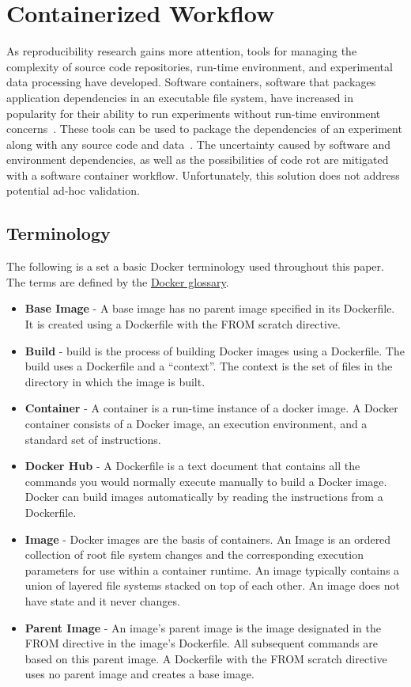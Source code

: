 \documentclass{IEEEtran}
\begin{document}
\section{Containerized Workflow}
As reproducibility research gains more attention, tools for managing the complexity of source code repositories, run-time environment, and experimental data processing have developed. Software containers, software that packages application dependencies in an executable file system, have increased in popularity for their ability to run experiments without run-time environment concerns~\cite{TPC}. These tools can be used to package the dependencies of an experiment along with any source code and data~\cite{TPC}. The uncertainty caused by software and environment dependencies, as well as the possibilities of code rot are mitigated with a software container workflow. Unfortunately, this solution does not address potential ad-hoc validation.

\subsection{Terminology}

The following is a set a basic Docker terminology used throughout this paper. The terms are defined by the \href{https://docs.docker.com/glossary/}{Docker glossary}.
\begin{itemize}
  \item \textbf{Base Image} - A base image has no parent image specified in its Dockerfile. It is created using a Dockerfile with the FROM scratch directive.
  \item \textbf{Build} - build is the process of building Docker images using a Dockerfile. The build uses a Dockerfile and a “context”. The context is the set of files in the directory in which the image is built.

  \item \textbf{Container} - A container is a run-time instance of a docker image. A Docker container consists of a Docker image, an execution environment, and a standard set of instructions.

  \item \textbf{Docker Hub}	- A Dockerfile is a text document that contains all the commands you would normally execute manually to build a Docker image. Docker can build images automatically by reading the instructions from a Dockerfile.

  \item \textbf{Image} - Docker images are the basis of containers. An Image is an ordered collection of root file system changes and the corresponding execution parameters for use within a container runtime. An image typically contains a union of layered file systems stacked on top of each other. An image does not have state and it never changes.

  \item \textbf{Parent Image} - An image’s parent image is the image designated in the FROM directive in the image’s Dockerfile. All subsequent commands are based on this parent image. A Dockerfile with the FROM scratch directive uses no parent image and creates a base image.
\end{itemize}
\end{document}
